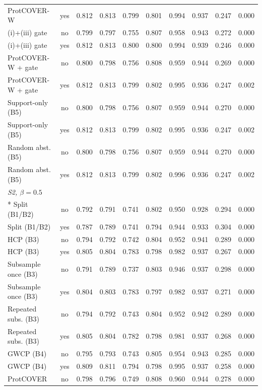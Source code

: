 \begin{longtable}{lccccccccc}
ProtCOVER-W & yes & 0.812 & 0.813 & 0.799 & 0.801 & 0.994 & 0.937 & 0.247 & 0.000 \\
(i)+(iii) gate & no & 0.799 & 0.797 & 0.755 & 0.807 & 0.958 & 0.943 & 0.272 & 0.000 \\
(i)+(iii) gate & yes & 0.812 & 0.813 & 0.800 & 0.800 & 0.994 & 0.939 & 0.246 & 0.000 \\
ProtCOVER-W + gate & no & 0.800 & 0.798 & 0.756 & 0.808 & 0.959 & 0.944 & 0.269 & 0.000 \\
ProtCOVER-W + gate & yes & 0.812 & 0.813 & 0.799 & 0.802 & 0.995 & 0.936 & 0.247 & 0.002 \\
Support-only (B5) & no & 0.800 & 0.798 & 0.756 & 0.807 & 0.959 & 0.944 & 0.270 & 0.000 \\
Support-only (B5) & yes & 0.812 & 0.813 & 0.799 & 0.802 & 0.995 & 0.936 & 0.247 & 0.002 \\
Random abst. (B5) & no & 0.800 & 0.798 & 0.756 & 0.807 & 0.959 & 0.944 & 0.270 & 0.000 \\
Random abst. (B5) & yes & 0.812 & 0.813 & 0.799 & 0.802 & 0.996 & 0.936 & 0.247 & 0.002 \\
\midrule
\multicolumn{10}{l}{\emph{S2, $\beta=0.5$}}\\*
Split (B1/B2) & no & 0.792 & 0.791 & 0.741 & 0.802 & 0.950 & 0.928 & 0.294 & 0.000 \\
Split (B1/B2) & yes & 0.787 & 0.789 & 0.741 & 0.794 & 0.944 & 0.933 & 0.304 & 0.000 \\
HCP (B3) & no & 0.794 & 0.792 & 0.742 & 0.804 & 0.952 & 0.941 & 0.289 & 0.000 \\
HCP (B3) & yes & 0.805 & 0.804 & 0.783 & 0.798 & 0.982 & 0.937 & 0.267 & 0.000 \\
Subsample once (B3) & no & 0.791 & 0.789 & 0.737 & 0.803 & 0.946 & 0.937 & 0.298 & 0.000 \\
Subsample once (B3) & yes & 0.804 & 0.803 & 0.783 & 0.797 & 0.982 & 0.937 & 0.271 & 0.000 \\
Repeated subs. (B3) & no & 0.794 & 0.792 & 0.743 & 0.804 & 0.952 & 0.942 & 0.289 & 0.000 \\
Repeated subs. (B3) & yes & 0.805 & 0.804 & 0.782 & 0.798 & 0.981 & 0.937 & 0.268 & 0.000 \\
GWCP (B4) & no & 0.795 & 0.793 & 0.743 & 0.805 & 0.954 & 0.943 & 0.285 & 0.000 \\
GWCP (B4) & yes & 0.809 & 0.811 & 0.794 & 0.798 & 0.995 & 0.937 & 0.258 & 0.000 \\
ProtCOVER & no & 0.798 & 0.796 & 0.749 & 0.808 & 0.960 & 0.944 & 0.278 & 0.000 \\

\end{longtable}
